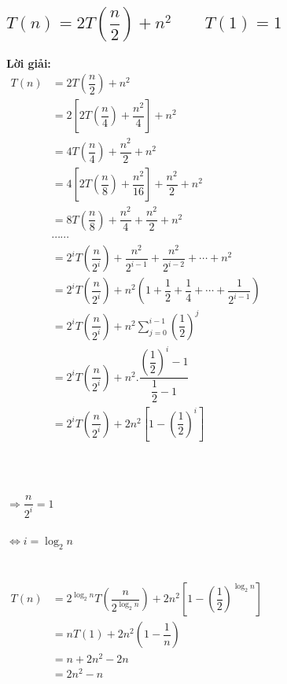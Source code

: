 \documentclass[12pt, letterpaper]{article}
\begin{document}
\subsection{$T(n) = 2T(\dfrac{n}{2}) + n^2 \quad \quad T(1) = 1$}
\textbf{Lời giải:} \\
$ \begin{aligned}
    T(n) &= 2T(\dfrac{n}{2}) + n^2 \\
        &= 2[2T(\dfrac{n}{4}) + \dfrac{n^2}{4}] + n^2 \\
        &= 4T(\dfrac{n}{4}) + \dfrac{n^2}{2} + n^2 \\
        &= 4[2T(\dfrac{n}{8}) + \dfrac{n^2}{16}] + \dfrac{n^2}{2} + n^2 \\
        &= 8T(\dfrac{n}{8}) + \dfrac{n^2}{4} + \dfrac{n^2}{2} + n^2 \\
        &\cdots \cdots \\
        &= 2^iT(\dfrac{n}{2^i}) + \dfrac{n^2}{2^{i-1}} + \dfrac{n^2}{2^{i-2}} + \cdots + n^2 \\
        &= 2^iT(\dfrac{n}{2^i}) + n^2(1 + \dfrac{1}{2} + \dfrac{1}{4} + \cdots + \dfrac{1}{2^{i-1}}) \\
        &= 2^iT(\dfrac{n}{2^i}) + n^2 \sum_{j=0}^{i-1} (\dfrac{1}{2})^j \\
        &= 2^iT(\dfrac{n}{2^i}) + n^2 . \dfrac{(\dfrac{1}{2})^i - 1}{\dfrac{1}{2} - 1} \\
        &= 2^iT(\dfrac{n}{2^i}) + 2n^2 [1 - (\dfrac{1}{2})^i] \\
\end{aligned} $ \\ \\ \\
 \\
$\Rightarrow \dfrac{n}{2^i} = 1$ \\ \\
$\Leftrightarrow i = \log_2{n}$ \\ \\
 \\
$ \begin{aligned}
    T(n) &= 2^{\log_2{n}}T(\dfrac{n}{2^{\log_2{n}}}) + 2n^2[1 - (\dfrac{1}{2})^{\log_2{n}}] \\
        &= nT(1) + 2n^2(1 - \dfrac{1}{n}) \\
        &= n + 2n^2 - 2n \\
        &= 2n^2 - n
\end{aligned} $\\
\end{document}
